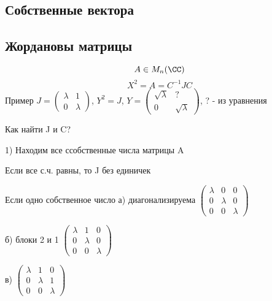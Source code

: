 \documentclass[12pt, fleqn]{article}
\begin{document}
    \subsection{Собственные вектора}
    \subsection{Жордановы матрицы}

    \begin{Example}
        \[A \in M_n(\CC)\]
        \[X^2=A=C^{-1}J C\]
        Пример $J=\begin{pmatrix}
          \lambda & 1\\
          0 & \lambda
        \end{pmatrix}$, $Y^2=J$, $Y=\begin{pmatrix}
          \sqrt{\lambda} & ?\\
          0 & \sqrt{\lambda}
        \end{pmatrix}$, ? - из уравнения
    \end{Example}

    Как найти J и C?

    1) Находим все ссобственные числа матрицы A

    Если все с.ч. равны, то J без единичек

    Если одно собственное число
    а) диагонализируема
    $\begin{pmatrix}
    \lambda & 0 & 0\\
    0 & \lambda & 0\\
    0 & 0 & \lambda
    \end{pmatrix}$

    б) блоки 2 и 1
    $\begin{pmatrix}
    \lambda & 1 & 0\\
    0 & \lambda & 0\\
    0 & 0 & \lambda
    \end{pmatrix}$

    в) $\begin{pmatrix}
    \lambda & 1 & 0\\
    0 & \lambda & 1\\
    0 & 0 & \lambda
    \end{pmatrix}$
\end{document}
